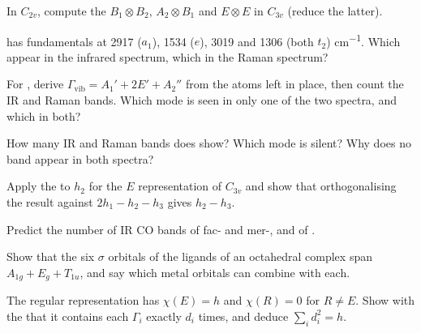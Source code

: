 \begin{exercise}[$\star$]\label{exo:b3:group-theory-applied:3}
In $C_{2v}$, compute the  $B_1\otimes B_2$, $A_2\otimes B_1$ and
$E\otimes E$ in $C_{3v}$ (reduce the latter).
\end{exercise}

\begin{exercise}[$\star$]\label{exo:b3:group-theory-applied:4}
 has fundamentals at 2917 ($a_1$), 1534 ($e$), 3019 and 1306 (both $t_2$)
\unit{cm^{-1}}. Which appear in the infrared spectrum, which in the Raman
spectrum?
\end{exercise}

\begin{exercise}[$\star\star$]\label{exo:b3:group-theory-applied:5}
For , derive $\Gamma_{\mathrm{vib}} = A_1' + 2E' + A_2''$ from the atoms left in
place, then count the IR and Raman bands. Which mode is seen in only one of
the two spectra, and which in both?
\end{exercise}

\begin{exercise}[$\star\star$]\label{exo:b3:group-theory-applied:6}
How many IR and Raman bands does  show? Which mode is silent? Why
does no band appear in both spectra?
\end{exercise}

\begin{exercise}[$\star\star$]\label{exo:b3:group-theory-applied:7}
Apply the  to $h_2$ for the $E$ representation of $C_{3v}$ and
show that orthogonalising the result against $2h_1 - h_2 - h_3$ gives $h_2 - h_3$.
\end{exercise}

\begin{exercise}[$\star\star$]\label{exo:b3:group-theory-applied:8}
Predict the number of IR CO bands of fac- and mer-, and of
.
\end{exercise}

\begin{exercise}[$\star\star$]\label{exo:b3:group-theory-applied:9}
Show that the six $\sigma$ orbitals of the ligands of an octahedral complex span
$A_{1g} + E_g + T_{1u}$, and say which metal orbitals can combine with each.
\end{exercise}

\begin{exercise}[$\star\star\star$]\label{exo:b3:group-theory-applied:10}
The regular representation has $\chi(E) = h$ and $\chi(R) = 0$ for $R \ne E$. Show
with the  that it contains each  $\Gamma_i$ exactly $d_i$ times, and deduce $\sum_id_i^2 = h$.
\end{exercise}

